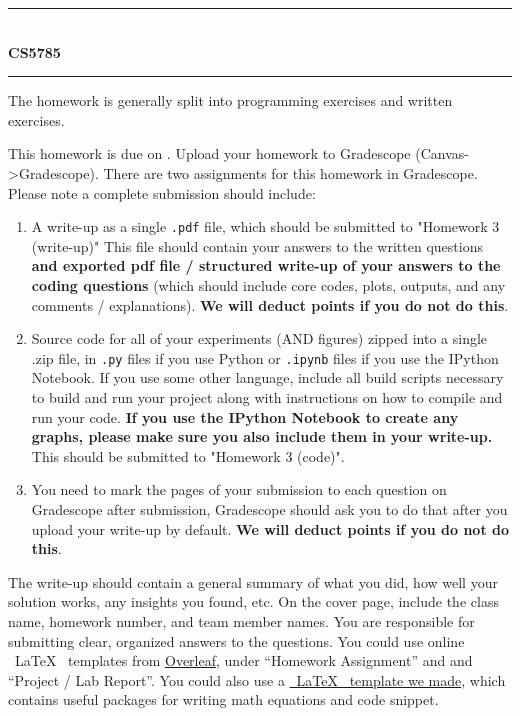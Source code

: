 %
%
%

\begin{center}
\newcommand{\HRule}{\rule{\linewidth}{0.5mm}}
\HRule \\[0.4cm]
{ \huge \bfseries CS5785 \thetitle} \\ %
\HRule
\end{center}


\begin{framed}\label{formatting-guidelines}
The homework is generally split into programming exercises and written exercises.

This homework is due on \textbf{\hwduedate}. Upload your homework to Gradescope (Canvas->Gradescope). There are two assignments for this homework in Gradescope. Please note a complete submission should include:
\begin{enumerate}
\item A write-up as a single \texttt{.pdf} file, which should be submitted to "Homework 3 (write-up)" This file should contain your answers to the written questions \textbf{and exported pdf file / structured write-up of your answers to the coding questions} (which should include core codes, plots, outputs, and any comments / explanations). \textbf{We will deduct points if you do not do this}.
\item Source code for all of your experiments (AND figures) zipped into a single .zip file, in \texttt{.py} files if you use Python or \texttt{.ipynb} files if you use the IPython Notebook. If you use some other language, include all build scripts necessary to build and run your project along with instructions on how to compile and run your code. \textbf{If you use the IPython Notebook to create any graphs, please make sure you also include them in your write-up.} This should be submitted to "Homework 3 (code)".
\item You need to mark the pages of your submission to each question on Gradescope after submission, Gradescope should ask you to do that after you upload your write-up by default. \textbf{We will deduct points if you do not do this}.
\end{enumerate}
The write-up should contain a general summary of what you did, how well your solution works, any insights you found, etc. On the cover page, include the class name, homework number, and team member names. You are responsible for submitting clear, organized answers to the questions.
You could use online ~\LaTeX~ templates from \href{https://www.overleaf.com/latex/templates/}{Overleaf}, under ``Homework Assignment'' and and ``Project / Lab Report''. You could also use a \href{https://drive.google.com/file/d/1jn_BEAHw8khTWdTWoU2rQeOxymTnmBSY/view?usp=sharing}{~\LaTeX~ template we made}, which contains useful packages for writing math equations and code snippet. 


\end{framed}
